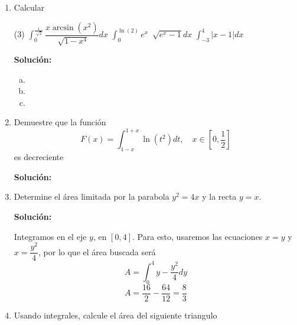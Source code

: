 \documentclass[12pt]{article}
\newenvironment{solucion}
{\begin{mdframed}[backgroundcolor=black!10]
		{\bf Solución:}\\
	}
	{
	\end{mdframed}
}
\newenvironment{preguntas}
{\begin{enumerate}\itemsep12pt
	}
	{
	\end{enumerate}
}
\begin{document}
\begin{preguntas}
\item Calcular
\begin{tasks}(3)
\task $\displaystyle\int_0^{\frac{1}{\sqrt[]{2}}} \dfrac{x \arcsin(x^2)}{\sqrt[]{1-x^4}}dx$
\task $\displaystyle\int_0^{\ln(2)} e^x\ \sqrt[]{e^x-1}dx$
\task $\displaystyle\int_{-3}^{4} |x-1|dx$
\end{tasks}
\begin{solucion}

\begin{enumerate}[a)]
\item 
\item 
\item 
\end{enumerate}
\end{solucion}
\item Demuestre que la función
$$F(x) = \displaystyle\int_{1-x}^{1+x} \ln(t^2)dt, \quad x \in [0, \frac{1}{2}]$$
es decreciente
\begin{solucion}

\end{solucion}
\item Determine el área limitada por la parabola $y^2=4x$ y la recta $y=x$.
\begin{solucion}
\begin{center}
		\end{center}
		Integramos en el eje $y$, en $[0,4]$. Para esto, usaremos las ecuaciones $x=y$ y $x=\dfrac{y^2}{4}$, por lo que el área buscada será
		$$A = \displaystyle\int_0^4 y-\dfrac{y^2}{4} dy$$
		$$A = \dfrac{16}{2} - \dfrac{64}{12} = \dfrac{8}{3}$$
\end{solucion}
\item Usando integrales, calcule el área del siguiente triangulo
	\begin{center}
\end{center}
\end{preguntas}
\end{document}
